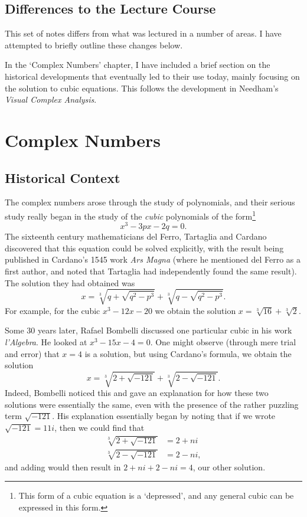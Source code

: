 \documentclass[a4]{scrreprt}
\begin{document}
\section{Differences to the Lecture Course}

This set of notes differs from what was lectured in a number of areas. I have attempted to briefly outline these changes below.

In the `Complex Numbers' chapter, I have included a brief section on the historical developments that eventually led to their use today, mainly focusing on the solution to cubic equations.
This follows the development in Needham's \emph{Visual Complex Analysis}.

\chapter{Complex Numbers}

\section{Historical Context}

The complex numbers arose through the study of polynomials, and their serious study really began in the study of the \emph{cubic} polynomials of the form\footnote{This form of a cubic equation is a `depressed', and any general cubic can be expressed in this form.}
$$
x^3 - 3px - 2q = 0.
$$
The sixteenth century mathematicians del Ferro, Tartaglia and Cardano discovered that this equation could be solved explicitly, with the result being published in Cardano's 1545 work \emph{Ars Magna} (where he mentioned del Ferro as a first author, and noted that Tartaglia had independently found the same result).
The solution they had obtained was
$$
x = \sqrt[3]{q + \sqrt{q^2 - p^3}} + \sqrt[3]{q - \sqrt{q^2 - p^3}}.
$$
For example, for the cubic $x^3 - 12x - 20$ we obtain the solution $x = \sqrt[3]{16} + \sqrt[3]{2}$. 

Some 30 years later, Rafael Bombelli discussed one particular cubic in his work \emph{l'Algebra}. He looked at $x^3 - 15x - 4 = 0$.
One might observe (through mere trial and error) that $x = 4$ is a solution, but using Cardano's formula, we obtain the solution
$$
x = \sqrt[3]{2 + \sqrt{-121}} + \sqrt[3]{2 - \sqrt{-121}}.
$$
Indeed, Bombelli noticed this and gave an explanation for how these two solutions were essentially the same, even with the presence of the rather puzzling term $\sqrt{-121}$.
His explanation essentially began by noting that if we wrote $\sqrt{-121} = 11i$, then we could find that
\begin{align*}
	\sqrt[3]{2 + \sqrt{-121}} &= 2 + ni \\
	\sqrt[3]{2 - \sqrt{-121}} &= 2 - ni,
\end{align*}
and adding would then result in $2 + ni + 2 - ni = 4$, our other solution.
\end{document}
